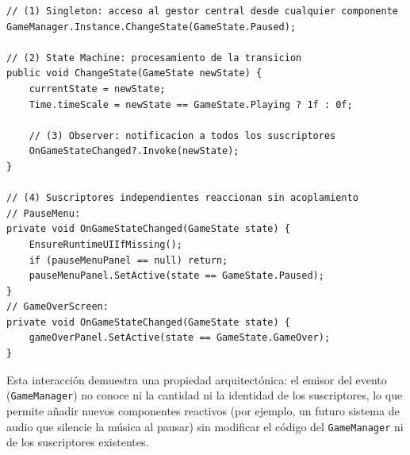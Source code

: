 \begin{lstlisting}
// (1) Singleton: acceso al gestor central desde cualquier componente
GameManager.Instance.ChangeState(GameState.Paused);

// (2) State Machine: procesamiento de la transicion
public void ChangeState(GameState newState) {
    currentState = newState;
    Time.timeScale = newState == GameState.Playing ? 1f : 0f;
    
    // (3) Observer: notificacion a todos los suscriptores
    OnGameStateChanged?.Invoke(newState);
}

// (4) Suscriptores independientes reaccionan sin acoplamiento
// PauseMenu:
private void OnGameStateChanged(GameState state) {
    EnsureRuntimeUIIfMissing();
    if (pauseMenuPanel == null) return;
    pauseMenuPanel.SetActive(state == GameState.Paused);
}
// GameOverScreen:
private void OnGameStateChanged(GameState state) {
    gameOverPanel.SetActive(state == GameState.GameOver);
}
\end{lstlisting}


Esta interacción demuestra una propiedad arquitectónica: el emisor del evento (\texttt{GameManager}) no conoce ni la cantidad ni la identidad de los suscriptores, lo que permite añadir nuevos componentes reactivos (por ejemplo, un futuro sistema de audio que silencie la música al pausar) sin modificar el código del \texttt{GameManager} ni de los suscriptores existentes.
